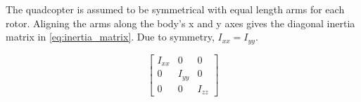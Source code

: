 \documentclass[letterpaper,12pt,titlepage,oneside,final]{book}
\begin{document}



The quadcopter is assumed to be symmetrical with equal length arms for each rotor. 
Aligning the arms along the body's x and y axes gives the diagonal inertia matrix in \eqref{eq:inertia_matrix}. 
Due to symmetry, $I_{xx} = I_{yy}$.

\begin{equation} \label{eq:inertia_matrix}
\begin{bmatrix}
I_{xx} & 0 & 0 \\
0 & I_{yy} & 0 \\
0 & 0 & I_{zz}
\end{bmatrix}
\end{equation}
\end{document}
